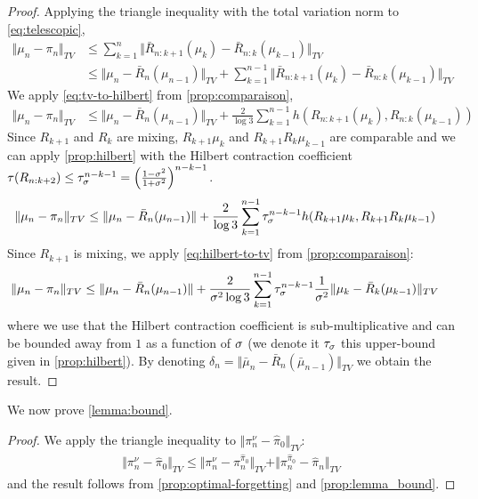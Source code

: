 \begin{proof}
Applying the triangle inequality with the total variation norm to \cref{eq:telescopic},
\begin{align}
    \Vert \mu_n - \pi_n \Vert_{TV} &\leq \sum_{k=1}^n \Vert \bar R_{n:k+1}(\mu_k) - \bar R_{n:k}(\mu_{k-1}) \Vert_{TV} & \\
    & \leq \Vert \mu_n - \bar R_n(\mu_{n-1})\Vert_{TV} +\sum_{k=1}^{n-1} \Vert \bar R_{n:k+1}(\mu_k) - \bar R_{n:k}(\mu_{k-1}) \Vert_{TV} &
\end{align}
We apply \cref{eq:tv-to-hilbert} from \cref{prop:comparaison},
\begin{align}
    \Vert \mu_n - \pi_n \Vert_{TV}& \leq \Vert \mu_n - \bar R_n(\mu_{n-1})\Vert_{TV} + \frac{2}{\log 3}\sum_{k=1}^{n-1}h(R_{n:k+1}(\mu_k), R_{n:k}(\mu_{k-1}))
\end{align}
Since $R_{k+1}$ and $R_k$ are mixing, $R_{k+1}\mu_k$ and $R_{k+1}R_{k}\mu_{k-1}$ are comparable and we can apply \cref{prop:hilbert} with the Hilbert contraction coefficient $\tau(R_{n:k+2})\leq \tau_\sigma^{n-k-1}= \left(\frac{1-\sigma^2}{1+\sigma^2}\right)^{n-k-1}$.
\begin{align}
\Vert \mu_n - \pi_n \Vert_{TV}& \leq \Vert \mu_n - \bar R_n(\mu_{n-1})\Vert + \frac{2}{\log 3}\sum_{k=1}^{n-1}\tau_\sigma^{n-k-1}h(R_{k+1}\mu_k, R_{k+1}R_k\mu_{k-1})
\end{align}
Since $R_{k+1}$ is mixing, we apply \cref{eq:hilbert-to-tv} from \cref{prop:comparaison}:
\begin{align}
\Vert \mu_n - \pi_n \Vert_{TV}& \leq \Vert \mu_n - \bar R_n(\mu_{n-1})\Vert + \frac{2}{\sigma^2\log 3}\sum_{k=1}^{n-1}\tau_\sigma^{n-k-1}\frac{1}{\sigma^2}\Vert \mu_k - \bar R_{k}(\mu_{k-1})\Vert_{TV}
\end{align}
where we use that the Hilbert contraction coefficient is sub-multiplicative and can be bounded away from $1$ as a function of $\sigma$ (we denote it $\tau_\sigma$ this upper-bound given in \cref{prop:hilbert}). By denoting $\delta_n = \Vert \bar\mu_n - \bar{R}_n(\bar\mu_{n-1})\Vert_{TV}$ we obtain the result.
\end{proof}

We now prove \cref{lemma:bound}.

\begin{proof}
We apply the triangle inequality to $\Vert \pi^\nu_n - \hat\pi_0\Vert_{TV}$:
\begin{align}
    \Vert \pi^\nu_n - \hat\pi_0\Vert_{TV} \leq  \Vert \pi^\nu_n - \pi_n^{\hat \pi_0}\Vert_{TV} + \Vert \pi^{\hat\pi_0}_n - \hat\pi_n\Vert_{TV}
\end{align} and the result follows from \cref{prop:optimal-forgetting} and \cref{prop:lemma_bound}.
\end{proof}

